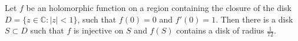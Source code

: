 \documentclass[12pt]{article}
\begin{document}
Let $f$ be an holomorphic function on a region containing the closure of the disk $D=\{z\in\mathbb{C}:|z|<1\}$, such that $f(0)=0$ and $f'(0)=1$. Then there is a disk $S\subset D$ such that $f$ is injective on $S$ and $f(S)$ contains a disk of radius $\frac{1}{72}$.
\end{document}
